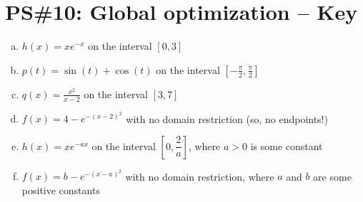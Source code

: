 
\usepackage[dvipsnames]{xcolor}
\usepackage{signchart}



%


\allowdisplaybreaks


\section{PS\#10: Global optimization -- Key}

{\everymath{\displaystyle}
\begin{enumerate}[(a)]
    \item $h(x) = xe^{-x}$ on the interval $[0, 3]$
    

    \item $p(t) = \sin(t) + \cos(t)$ on the interval $\left[-\frac{\pi}{2}, \frac{\pi}{2}\right]$
    \item $q(x) = \frac{x^2}{x-2}$ on the interval $[3, 7]$
    \item $f(x) = 4 - e^{-(x-2)^2}$ with no domain restriction (so, no endpoints!)
    \item $h(x) = xe^{-ax}$ on the interval $\left[0, \dfrac2a\right]$, where $a > 0$ is some constant
    \item $f(x) = b - e^{-(x-a)^2}$ with no domain restriction, where $a$ and $b$ are some positive constants
\end{enumerate}
}

